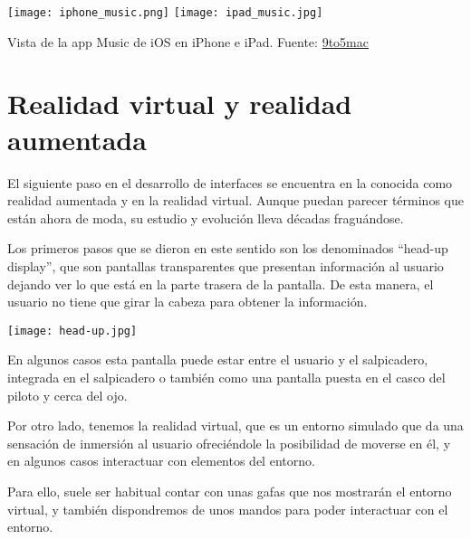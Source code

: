 {
    \hfill
    \texttt{[image: iphone\_music.png]}
    \hfill
    \texttt{[image: ipad\_music.jpg]}
    \hfill
}

\vspace{-15pt}
\begin{center}
    {\scriptsize  Vista de la app Music de iOS en iPhone e iPad. Fuente: \href{https://9to5mac.com/2020/06/24/ios-14-apple-music/}{9to5mac}}
\end{center}




\section{Realidad virtual y realidad aumentada}

El siguiente paso en el desarrollo de interfaces se encuentra en la conocida como realidad aumentada y en la realidad virtual. Aunque puedan parecer términos que están ahora de moda, su estudio y evolución lleva décadas fraguándose.

Los primeros pasos que se dieron en este sentido son los denominados “head-up display”, que son pantallas transparentes que presentan información al usuario dejando ver lo que está en la parte trasera de la pantalla. De esta manera, el usuario no tiene que girar la cabeza para obtener la información.

\vspace{-10pt}
\begin{center}
    \texttt{[image: head-up.jpg]}
\end{center}

En algunos casos esta pantalla puede estar entre el usuario y el salpicadero, integrada en el salpicadero o también como una pantalla puesta en el casco del piloto y cerca del ojo.

Por otro lado, tenemos la realidad virtual, que es un entorno simulado que da una sensación de inmersión al usuario ofreciéndole la posibilidad de moverse en él, y en algunos casos interactuar con elementos del entorno.

Para ello, suele ser habitual contar con unas gafas que nos mostrarán el entorno virtual, y también dispondremos de unos mandos para poder interactuar con el entorno.

